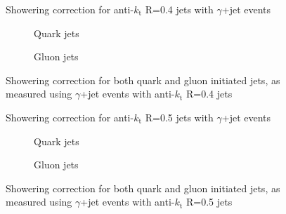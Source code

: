 \clearpage
\begin{figure}[!ht]
 \centering
 \caption[Showering correction for anti-$k_{\mathrm t}$ R=0.4 jets with $\gamma$+jet events]
 {\small Showering correction for anti-$k_{\mathrm t}$ R=0.4 jets with $\gamma$+jet events}
 \label{plot:GJetShowering4App}
\end{figure}

\begin{figure}[!ht]
 \centering
 \begin{subfigure}{.5\textwidth}
  \centering
  \caption{Quark jets}
 \end{subfigure}%
 \begin{subfigure}{.5\textwidth}
  \centering
  \caption{Gluon jets}
 \end{subfigure}
 \caption[Quark/gluon jet showering correction, anti-$k_{\mathrm t}$ R=0.4, $\gamma$+jet]
 {\small Showering correction for both quark and gluon initiated jets, as measured using $\gamma$+jet events with anti-$k_{\mathrm t}$ R=0.4 jets}
 \label{plot:GJetShoweringFlav4App}
\end{figure}

\clearpage
\begin{figure}[!ht]
 \centering
 \caption[Showering correction for anti-$k_{\mathrm t}$ R=0.5 jets with $\gamma$+jet events]
 {\small Showering correction for anti-$k_{\mathrm t}$ R=0.5 jets with $\gamma$+jet events}
 \label{plot:GJetShowering5App}
\end{figure}

\begin{figure}[!ht]
 \centering
 \begin{subfigure}{.5\textwidth}
  \centering
  \caption{Quark jets}
 \end{subfigure}%
 \begin{subfigure}{.5\textwidth}
  \centering
  \caption{Gluon jets}
 \end{subfigure}
 \caption[Quark/gluon jet showering correction, anti-$k_{\mathrm t}$ R=0.5, $\gamma$+jet]
 {\small Showering correction for both quark and gluon initiated jets, as measured using $\gamma$+jet events with anti-$k_{\mathrm t}$ R=0.5 jets}
 \label{plot:GJetShoweringFlav5App}
\end{figure}

